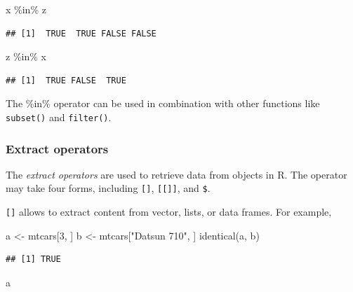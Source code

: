 \documentclass[
  12pt,
  oneside]{book}
\newenvironment{Shaded}{\begin{snugshade}}{\end{snugshade}}
\newcommand{\DecValTok}[1]{\textcolor[rgb]{0.00,0.00,0.81}{#1}}
\newcommand{\FunctionTok}[1]{\textcolor[rgb]{0.00,0.00,0.00}{#1}}
\newcommand{\NormalTok}[1]{#1}
\newcommand{\OtherTok}[1]{\textcolor[rgb]{0.56,0.35,0.01}{#1}}
\newcommand{\SpecialCharTok}[1]{\textcolor[rgb]{0.00,0.00,0.00}{#1}}
\newcommand{\StringTok}[1]{\textcolor[rgb]{0.31,0.60,0.02}{#1}}
\theoremstyle{definition}
\theoremstyle{definition}
\theoremstyle{definition}
\theoremstyle{definition}
\theoremstyle{remark}
\begin{document}
\begin{Shaded}
\begin{Highlighting}[]
\NormalTok{x }\SpecialCharTok{\%in\%}\NormalTok{ z  }
\end{Highlighting}
\end{Shaded}

\begin{verbatim}
## [1]  TRUE  TRUE FALSE FALSE
\end{verbatim}

\begin{Shaded}
\begin{Highlighting}[]
\NormalTok{z }\SpecialCharTok{\%in\%}\NormalTok{ x}
\end{Highlighting}
\end{Shaded}

\begin{verbatim}
## [1]  TRUE FALSE  TRUE
\end{verbatim}

The \%in\% operator can be used in combination with other functions like \texttt{subset()} and \texttt{filter()}.

\hypertarget{extract-operators}{%
\subsubsection{Extract operators}\label{extract-operators}}

The \emph{extract operators} are used to retrieve data from objects in R. The operator may take four forms, including \texttt{{[}{]}}, \texttt{{[}{[}{]}{]}}, and \texttt{\$}.

\texttt{{[}{]}} allows to extract content from vector, lists, or data frames. For example,

\begin{Shaded}
\begin{Highlighting}[]
\NormalTok{a }\OtherTok{\textless{}{-}}\NormalTok{ mtcars[}\DecValTok{3}\NormalTok{, ]}
\NormalTok{b }\OtherTok{\textless{}{-}}\NormalTok{ mtcars[}\StringTok{"Datsun 710"}\NormalTok{, ]}
\FunctionTok{identical}\NormalTok{(a, b)}
\end{Highlighting}
\end{Shaded}

\begin{verbatim}
## [1] TRUE
\end{verbatim}

\begin{Shaded}
\begin{Highlighting}[]
\NormalTok{a}
\end{Highlighting}
\end{Shaded}
\end{document}
